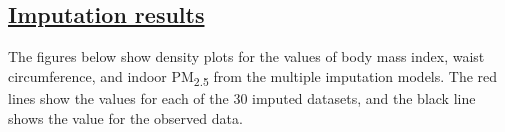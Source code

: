 \documentclass[
  letterpaper,
  DIV=11,
  numbers=noendperiod]{scrartcl}
\providecommand{\DIFadd}[1]{{\protect\color{blue}\underline{#1}}} %
\providecommand{\DIFaddbegin}{} %
\providecommand{\DIFaddend}{} %
\providecommand{\DIFdelbegin}{} %
\providecommand{\DIFdelend}{} %
\newcommand{\DIFscaledelfig}{0.5}
\newlength{\DIFdelgraphicswidth} %
\newlength{\DIFdelgraphicsheight} %
\newcommand{\DIFaddincludegraphics}[2][]{{\color{blue}\fbox{\DIFOincludegraphics[#1]{#2}}}} %
\newcommand{\DIFdelincludegraphics}[2][]{%
\sbox{\DIFdelgraphicsbox}{\DIFOincludegraphics[#1]{#2}}%
\settoboxwidth{\DIFdelgraphicswidth}{\DIFdelgraphicsbox} %
\settoboxtotalheight{\DIFdelgraphicsheight}{\DIFdelgraphicsbox} %
\scalebox{\DIFscaledelfig}{%
\parbox[b]{\DIFdelgraphicswidth}{\usebox{\DIFdelgraphicsbox}\\[-\baselineskip] \rule{\DIFdelgraphicswidth}{0em}}\llap{\resizebox{\DIFdelgraphicswidth}{\DIFdelgraphicsheight}{%
\setlength{\unitlength}{\DIFdelgraphicswidth}%
\begin{picture}(1,1)%
\thicklines\linethickness{2pt} %
{\color[rgb]{1,0,0}\put(0,0){\framebox(1,1){}}}%
{\color[rgb]{1,0,0}\put(0,0){\line( 1,1){1}}}%
{\color[rgb]{1,0,0}\put(0,1){\line(1,-1){1}}}%
\end{picture}%
}\hspace*{3pt}}} %
} %
\DeclareRobustCommand{\DIFaddbegin}{\DIFOaddbegin \let\includegraphics\DIFaddincludegraphics} %
\DeclareRobustCommand{\DIFaddend}{\DIFOaddend \let\includegraphics\DIFOincludegraphics} %
\DeclareRobustCommand{\DIFdelbegin}{\DIFOdelbegin \let\includegraphics\DIFdelincludegraphics} %
\DeclareRobustCommand{\DIFdelend}{\DIFOaddend \let\includegraphics\DIFOincludegraphics} %
\begin{document}
\newpage

\DIFdelbegin %
\DIFdelend \DIFaddbegin \subsection{\DIFadd{Imputation results}}\label{imputation-results}
\DIFaddend 

The figures below show density plots for the values of body mass index,
waist circumference, and indoor PM\textsubscript{2.5} from the multiple
imputation models. The red lines show the values for each of the 30
imputed datasets, and the black line shows the value for the observed
data.
\end{document}

